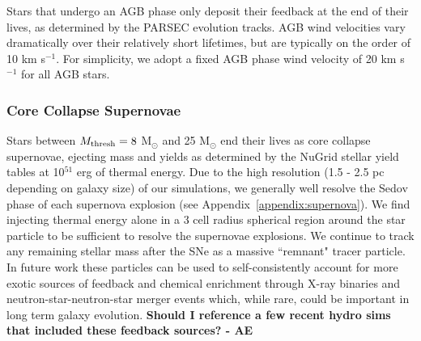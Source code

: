 \documentclass[twocolumn]{aastex61}
\begin{document}

Stars that undergo an AGB phase only deposit their feedback at the end of their lives, as determined by the PARSEC evolution tracks. AGB wind velocities vary dramatically over their relatively short lifetimes, but are typically on the order of 10 km s$^{-1}$. For simplicity, we adopt a fixed AGB phase wind velocity of 20 km s$^{-1}$ for all AGB stars.

\subsubsection{Core Collapse Supernovae}
\label{sec: core collapse}
Stars between  $M_{\rm thresh} = 8$ M$_{\odot}$ and 25 M$_{\odot}$ end their lives as core collapse supernovae, ejecting mass and yields as determined by the NuGrid stellar yield tables at 10$^{51}$ erg of thermal energy. Due to the high resolution (1.5 - 2.5 pc depending on galaxy size) of our simulations, we generally well resolve the Sedov phase of each supernova explosion (see Appendix~\ref{appendix:supernova}). We find injecting thermal energy alone in a 3 cell radius spherical region around the star particle to be sufficient to resolve the supernovae explosions. We continue to track any remaining stellar mass after the SNe as a massive ``remnant" tracer particle. In future work these particles can be used to self-consistently account for more exotic sources of feedback and chemical enrichment through X-ray binaries and neutron-star-neutron-star merger events which, while rare, could be important in long term galaxy evolution.
\textbf{Should I reference a few recent hydro sims that included these feedback sources? - AE}
\end{document}
